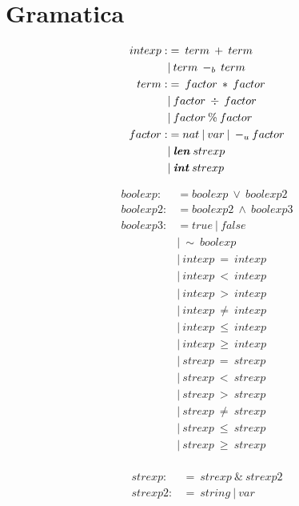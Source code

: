 \documentclass{article}
\begin{document}
    \section{Gramatica}
\begin{align*}
    intexp :&= \: term \: + \: term \\
    &| \: term \: -_{b} \: term \\
    term :&= \: factor \: * \: factor \\
    &| \: factor \: \div \: factor \\
    &| \: factor \: \% \: factor \\
    factor :&= nat \: | \: var \: | \: -_{u}factor\\
    &| \: \textbf{\textit{len}} \: strexp \\
    &| \: \textbf{\textit{int}} \: strexp \\
\end{align*}

\begin{align*}
    boolexp :&= boolexp \: \vee \: boolexp2 \\
    boolexp2 :&= boolexp2 \: \wedge \: boolexp3 \\
    boolexp3 :&= true \: | \: false \\
    &| \: \sim \: boolexp \\
    &| \: intexp \: = \: intexp \\
    &| \: intexp \: < \: intexp \\
    &| \: intexp \: > \: intexp \\
    &| \: intexp \: \ne \: intexp \\
    &| \: intexp \: \leq \: intexp \\
    &| \: intexp \: \geq \: intexp \\
    &| \: strexp \: = \: strexp \\
    &| \: strexp \: < \: strexp \\
    &| \: strexp \: > \: strexp \\
    &| \: strexp \: \ne \: strexp \\
    &| \: strexp \: \leq \: strexp \\
    &| \: strexp \: \geq \: strexp \\
\end{align*}

\begin{align*}
    strexp :&= \: strexp \: \& \: strexp2 \\
    strexp2 :&= \: string \: | \: var \\
\end{align*}
\end{document}
